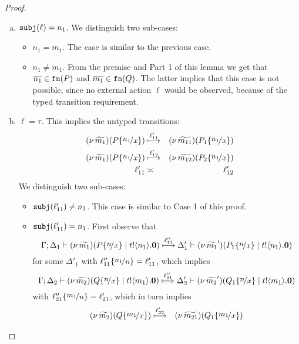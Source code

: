 \begin{proof}
\begin{enumerate}[1.]
\begin{enumerate}[(a)]
					\item	$\mathtt{subj}(\ell) = n_1$. We distinguish two sub-cases:
							\begin{itemize}
								\item	$n_1 = m_1$. The case is similar to the previous case.
								\item	$n_1 \not= m_1$.
										From the premise and Part 1 of this lemma we get
										that $\overline{n_1} \in \mathtt{fn}(P)$ and $\overline{m_1} \in \mathtt{fn}(Q)$.
										The latter implies that this case is not possible, since
										no external action $\ell$ would be observed, because
										of the typed transition requirement.
							\end{itemize}

					\item	$\ell = \tau$. This implies the untyped transitions:
							\begin{eqnarray}
								\newsp{\widetilde{m_1}}{P \subst{n_1}{x}} &\hby{\ell_{11}'}& \newsp{\widetilde{m_{11}}}{P_1 \subst{n_1}{x}}
								\label{lem:tr_app_41}\\
								\newsp{\widetilde{m_1}}{P \subst{n_1}{x}} &\hby{\ell_{12}'}& \newsp{\widetilde{m_{12}}}{P_2 \subst{n_1}{x}}
								\label{lem:tr_app_42}\\
								\ell_{11}' &\asymp& \ell_{12}'
							\end{eqnarray}
							We distinguish two sub-cases:
							\begin{itemize}
								\item	$\mathtt{subj}(\ell_{11}') \not= n_1$. This case is similar to Case 1 of this proof.
								\item	$\mathtt{subj}(\ell_{11}') = n_1$.
										First observe that
										\[
											\horel{\Gamma}{\Delta_1}{\newsp{\widetilde{m_1}}{P \subst{n}{x} \Par \bout{t}{n_1} \inact}}
											{ \hby{\ell_{11}''} }
											{\Delta_1'}{\newsp{\widetilde{m_1}'}{P_1 \subst{n}{x} \Par \bout{t}{n_1} \inact}}
										\]
										for some $\Delta'_1$
										with $\ell_{11}'' \subst{n_1}{n}  = \ell_{11}' $,
										which implies
										\[
											\horel{\Gamma}{\Delta_2}{\newsp{\widetilde{m_2}}{Q \subst{n}{x} \Par \bout{t}{m_1} \inact}}
											{ \Hby{\ell_{21}''} }
											{\Delta_2'}{\newsp{\widetilde{m_2}'}{Q_1 \subst{n}{x} \Par \bout{t}{m_1} \inact}}
										\]
										with $\ell_{21}'' \subst{m_1}{n}  = \ell_{21}' $,
										which in turn implies
										\begin{eqnarray}
											\newsp{\widetilde{m_2}}{Q \subst{m_1}{x}} &\hby{\ell_{22}'}& \newsp{\widetilde{m_{21}}}{Q_1 \subst{m_1}{x}}

\end{eqnarray}
\end{itemize}
\end{enumerate}
\end{enumerate}
\end{proof}
